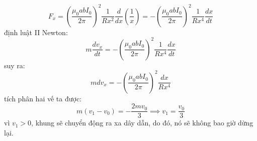 \begin{equation*}
  F_{x}=\left(\frac{\mu_{0}abI_{0}}{2\pi}\right)^{2}\frac{1}{Rx^{2}}\frac{d}{dx}\left(\frac{1}{x}\right)=-\left(\frac{\mu_{0}abI_{0}}{2\pi}\right)^{2}\frac{1}{Rx^{4}}\frac{dx}{dt}
\end{equation*}
định luật II Newton:
\begin{equation*}
  m\frac{dv_{x}}{dt}=-\left(\frac{\mu_{0}abI_{0}}{2\pi}\right)^{2}\frac{1}{Rx^{4}}\frac{dx}{dt}
\end{equation*}
suy ra:
\begin{equation*}
  mdv_{x}=-\left(\frac{\mu_{0}abI_{0}}{2\pi}\right)^{2}\frac{dx}{Rx^{4}}
\end{equation*}
tích phân hai vế ta được:
\begin{equation*}
  m(v_{1}-v_{0})=-\frac{2mv_{0}}{3}\implies v_{1}=\frac{v_{0}}{3}
\end{equation*}
vì $v_{1}>0$, khung sẽ chuyển động ra xa dây dẫn, do đó, nó sẽ không bao giờ dừng lại.\\

